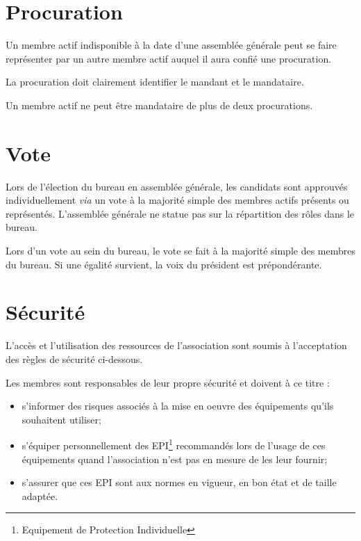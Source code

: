 \documentclass[a4paper, 11pt]{article}
\begin{document}

\section{Procuration} %

Un membre actif indisponible à la date d'une assemblée générale peut se faire représenter par un autre membre actif
auquel il aura confié une procuration.

La procuration doit clairement identifier le mandant et le mandataire.

Un membre actif ne peut être mandataire de plus de deux procurations.


\section{Vote} %

Lors de l'élection du bureau en assemblée générale, les candidats sont approuvés individuellement \textit{via} un vote à
la majorité simple des membres actifs présents ou représentés.
L'assemblée générale ne statue pas sur la répartition des rôles dans le bureau.

Lors d'un vote au sein du bureau, le vote se fait à la majorité simple des membres du bureau.
Si une égalité survient, la voix du président est prépondérante.


\section{Sécurité} %

L'accès et l'utilisation des ressources de l'association sont soumis à l'acceptation des règles de sécurité ci-dessous.

Les membres sont responsables de leur propre sécurité et doivent à ce titre :

\begin{itemize}
    \item s'informer des risques associés à la mise en oeuvre des équipements qu'ils souhaitent utiliser;
    \item s'équiper personnellement des EPI\footnote{Equipement de Protection Individuelle} recommandés lors de l'usage
        de ces équipements quand l'association n'est pas en mesure de les leur fournir;
    \item s'assurer que ces EPI sont aux normes en vigueur, en bon état et de taille adaptée.
\end{itemize}
\end{document}
